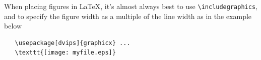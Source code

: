 \documentclass[10pt,twocolumn,letterpaper]{article}
\begin{document}
When placing figures in \LaTeX, it's almost always best to use
\verb+\includegraphics+, and to specify the  figure width as a multiple of
the line width as in the example below
{\small\begin{verbatim}
   \usepackage[dvips]{graphicx} ...
   \texttt{[image: myfile.eps]}
\end{verbatim}
}


{\small


}
\end{document}
